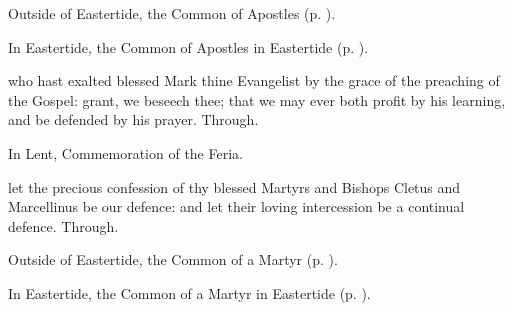\clearpage
{}

\begin{rubric}
	Outside of Eastertide, the Common of Apostles (p. \pageref{CommonApostles}).
\end{rubric}

\begin{rubric}
	In Eastertide, the Common of Apostles in Eastertide (p. \pageref{CommonApostlesEaster}).
\end{rubric}

{} who hast exalted blessed Mark thine Evangelist by the grace of the preaching of the Gospel: grant, we beseech thee; that we may ever both profit by his learning, and be defended by his prayer. Through.
\begin{rubric}
    In Lent, Commemoration of the Feria.%
\end{rubric}



%

\memorialCollect
{} let the precious confession of thy blessed Martyrs and Bishops Cletus and Marcellinus be our defence: and let their loving intercession be a continual defence. Through.




\begin{rubric}
	Outside of Eastertide, the Common of a Martyr (p. \pageref{CommonMartyrNotBishopCollect}).
\end{rubric}

\begin{rubric}
	In Eastertide, the Common of a Martyr in Eastertide (p. \pageref{CommonMartyrNotBishopEasterCollect}).
\end{rubric}


